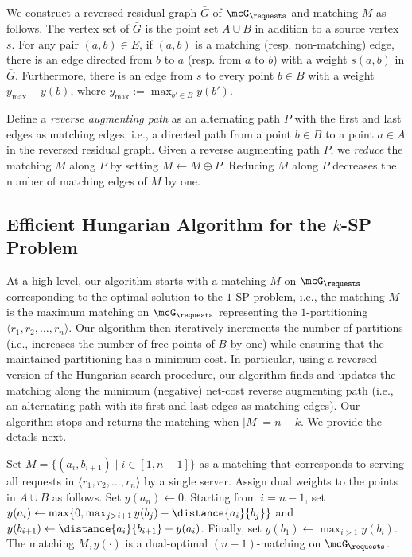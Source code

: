  We construct a reversed residual graph $\bar{G}$ of $\mcG_\requests$ and matching $M$ as follows. The vertex set of $\bar{G}$ is the point set $A\cup B$ in addition to a source vertex $s$. For any pair $(a,b)\in E$, if $(a,b)$ is a matching (resp. non-matching) edge, there is an edge directed from $b$ to $a$ (resp. from $a$ to $b$) with a weight $s(a,b)$ in $\bar{G}$. Furthermore, there is an edge from $s$ to every point $b\in B$ with a weight $y_{\max} - y(b)$, where $y_{\max}:=\max_{b'\in B} y(b')$. 

Define a \emph{reverse augmenting path} as an alternating path $P$ with the first and last edges as matching edges, i.e., a directed path from a point $b\in B$ to a point $a\in A$ in the reversed residual graph. Given a reverse augmenting path $P$, we \emph{reduce} the matching $M$ along $P$ by setting $M\leftarrow M\oplus P$. Reducing $M$ along $P$ decreases the number of matching edges of $M$ by one.


\subsection{Efficient Hungarian Algorithm for the \texorpdfstring{$k$}{}-SP Problem}\label{sec:hungarian_n2k_ksp}
%

At a high level, our algorithm starts with a matching $M$ on $\mcG_\requests$ corresponding to the optimal solution to the $1$-SP problem, i.e., the matching $M$ is the maximum matching on $\mcG_\requests$ representing the $1$-partitioning $\langle r_1, r_2,\ldots, r_n\rangle$. Our algorithm then iteratively increments the number of partitions (i.e., increases the number of free points of $B$ by one) while ensuring that the maintained partitioning has a minimum cost. In particular, using a reversed version of the Hungarian search procedure, our algorithm finds and updates the matching along the minimum (negative) net-cost reverse augmenting path (i.e., an alternating path with its first and last edges as matching edges). Our algorithm stops and returns the matching when $|M|=n-k$. We provide the details next.


 Set $M= \{(a_i, b_{i+1})\mid i\in[1, n-1]\}$ as a matching that corresponds to serving all requests in $\langle r_1, r_2,\ldots, r_n\rangle$ by a single server. Assign dual weights to the points in $A\cup B$ as follows. Set $y(a_n)\leftarrow 0$. Starting from $i=n-1$, set $y(a_{i})\leftarrow\max\{0, \max_{j>i+1}y(b_j)-\distance{a_{i}}{b_j}\}$ and $y(b_{i+1})\leftarrow\distance{a_{i}}{b_{i+1}} + y(a_{i})$. Finally, set $y(b_1)\leftarrow \max_{i>1}y(b_i)$. The matching $M, y(\cdot)$ is a dual-optimal $(n-1)$-matching on $\mcG_\requests$.



